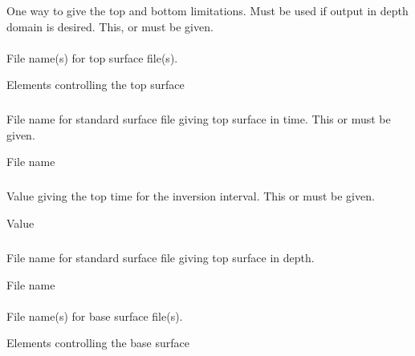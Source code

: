 \subsubsection{} 
 \slist
   \item \Description One way to give the top and bottom limitations. Must be used if output in depth domain is desired. This,  or  must be given.
   \item \Argument
   \item \Default
 \elist

\paragraph{\necessary} 
 \slist
   \item \Description File name(s) for top surface file(s).
   \item \Argument Elements controlling the top surface
   \item \Default
 \elist

\subparagraph{} 
 \slist
   \item \Description File name for standard surface file giving top surface in time. This or  must be given.
   \item \Argument File name
   \item \Default
 \elist

\subparagraph{} 
 \slist
   \item \Description Value giving the top time for the inversion interval. This or  must be given.
   \item \Argument Value
   \item \Default
 \elist

 \subparagraph{} 
 \slist
   \item \Description File name for standard surface file giving top surface in depth.
   \item \Argument File name
   \item \Default
 \elist

\paragraph{\necessary} 
 \slist
   \item \Description File name(s) for base surface file(s).
   \item \Argument Elements controlling the base surface
   \item \Default
 \elist

